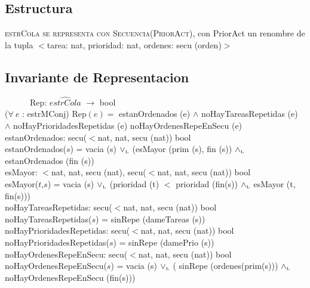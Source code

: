 \documentclass[a4paper,10pt]{article}
\newcommand{\sombrero}{\widehat}
\begin{document}
\newpage
\subsection{Estructura}

    \noindent \textsc{estrCola se representa con Secuencia(PriorAct)}, con PriorAct un renombre de la tupla $<$tarea: nat, prioridad: nat, ordenes: secu (orden)$>$


\subsection{Invariante de Representacion}
 	  	  	
 	\indent \ \ \ \ \ \ Rep: $\sombrero{estrCola}$ $\rightarrow$ bool \\
 	  	  	
 	  	  	($\forall\ e$ : estrMConj) Rep$(e) =$ estanOrdenados (e) $\wedge$ noHayTareasRepetidas (e) $\wedge$ noHayPrioridadesRepetidas (e) noHayOrdenesRepeEnSecu (e)\\
 	  	  	
 	  	  	estanOrdenados: secu($<$nat, nat, secu (nat)) \en bool\\
 	  	  	\indent estanOrdenados($s$) = vacia (s) $\lor_{\mathrm{\scriptscriptstyle{L}}}$ (esMayor (prim (s), fin (s)) $\land_{\mathrm{\scriptscriptstyle{L}}}$ estanOrdenados (fin (s))\\
 	  	  	
 	  	  	esMayor: $<$nat, nat, secu (nat), secu($<$nat, nat, secu (nat)) \en bool\\
 	  	  	\indent esMayor($t$,$s$) = vacia (s) $\lor_{\mathrm{\scriptscriptstyle{L}}}$ (prioridad (t) $<$ prioridad (fin(s)) $\land_{\mathrm{\scriptscriptstyle{L}}}$ esMayor (t, fin(s)))\\
 	  	  	
 	  	  	noHayTareasRepetidas: secu($<$nat, nat, secu (nat)) \en bool\\
 	  	  	\indent noHayTareasRepetidas($s$) = sinRepe (dameTareas (s))\\
 	  	  	
 	  	  	noHayPrioridadesRepetidas: secu($<$nat, nat, secu (nat)) \en bool\\
 	  	  	\indent noHayPrioridadesRepetidas($s$) = sinRepe (damePrio (s))\\
 	  	  	
 	  	  	noHayOrdenesRepeEnSecu: secu($<$nat, nat, secu (nat)) \en bool\\
 	  	  	\indent noHayOrdenesRepeEnSecu($s$) = vacia (s) $\lor_{\mathrm{\scriptscriptstyle{L}}}$ ( sinRepe (ordenes(prim(s))) $\land_{\mathrm{\scriptscriptstyle{L}}}$ noHayOrdenesRepeEnSecu (fin(s)))\\
 	  	  	
\end{document}
